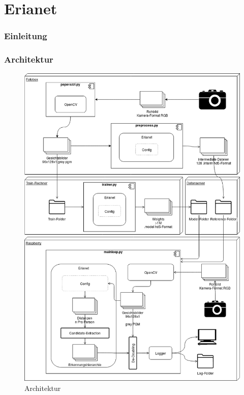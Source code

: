 \documentclass[12pt]{article}
\begin{document}
\tableofcontents
\newpage

\part{Erianet}
\section{Einleitung}

\section{Architektur}
\newpage
\afterpage{\clearpage}
\begin{figure}[H]
    \includegraphics[height=0.9\textheight]{Architektur}
    \caption{Architektur}
\end{figure}
\end{document}
